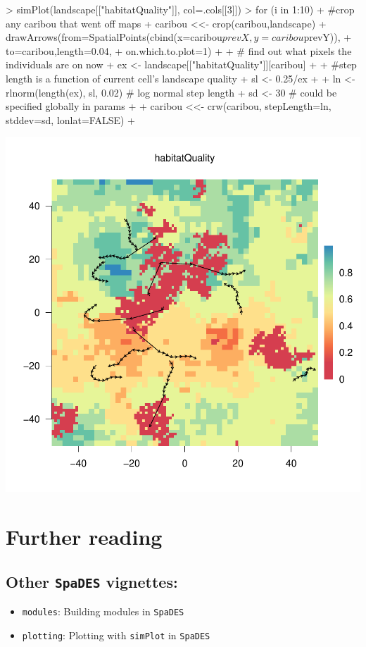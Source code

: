 \documentclass{article}
\begin{document}
\begin{Schunk}
\begin{Sinput}
> simPlot(landscape[["habitatQuality"]], col=.cols[[3]])
> for (i in 1:10) {
+   #crop any caribou that went off maps
+   caribou <<- crop(caribou,landscape)
+   drawArrows(from=SpatialPoints(cbind(x=caribou$prevX, y=caribou$prevY)),
+              to=caribou,length=0.04,
+              on.which.to.plot=1)
+
+   # find out what pixels the individuals are on now
+   ex <- landscape[["habitatQuality"]][caribou]
+
+   #step length is a function of current cell's landscape quality
+   sl <- 0.25/ex
+
+   ln <- rlnorm(length(ex), sl, 0.02) # log normal step length
+   sd <- 30 # could be specified globally in params
+
+   caribou <<- crw(caribou, stepLength=ln, stddev=sd, lonlat=FALSE)
+ }
\end{Sinput}
\end{Schunk}
\includegraphics{introduction-agent-crw-trajectory}

\newpage

\section{Further reading}

\subsection{Other \texttt{SpaDES} vignettes:}

\begin{itemize}
\item \texttt{modules}: Building modules in \texttt{SpaDES}
\item \texttt{plotting}: Plotting with \texttt{simPlot} in \texttt{SpaDES}
\end{itemize}
\end{document}
